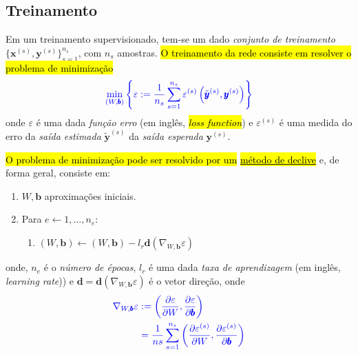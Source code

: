 \subsection{Treinamento}\label{cap_mlp_sec_modelo:ssec:treinamento}

Em um treinamento supervisionado, tem-se um dado \emph{conjunto de treinamento} $\{\pmb{x}^{(s)}, \pmb{y}^{(s)}\}_{s=1}^{n_s}$, com $n_s$ amostras. \hl{O treinamento da rede consiste em resolver o problema de minimização}
\begin{equation}\color{blue}\min_{(W,\pmb{b})}\left\{\varepsilon := \frac{1}{n_s}\sum_{s=1}^{n_s} \varepsilon^{(s)}\left(\tilde{\pmb{y}}^{(s)}, \pmb{y}^{(s)}\right)\right\}
\end{equation}
onde $\varepsilon$ é uma dada \emph{função erro} (em inglês, \hl{\textit{loss function}}) e $\varepsilon^{(s)}$ é uma medida do erro da \emph{saída estimada} $\tilde{\pmb{y}}^{(s)}$ da \emph{saída esperada} $\pmb{y}^{(s)}$.

\hl{O problema de minimização pode ser resolvido por um }\href{https://notaspedrok.com.br/notas/MatematicaNumericaAvancada/cap\_otimizacao_sec_minimi.html}{\hl{método de declive}} e, de forma geral, consiste em:
\begin{enumerate}
\item $W, \pmb{b}$ aproximações iniciais.
\item Para $e\leftarrow 1, \dotsc, n_e$:
  \begin{enumerate}\hleq
  \item $\displaystyle (W, \pmb{b}) \leftarrow (W, \pmb{b}) - l_r\pmb{d}\left(\nabla_{W,\pmb{b}} \varepsilon\right)$
  \end{enumerate}
\end{enumerate}
onde, $n_e$ é o \emph{número de épocas}, $l_r$ é uma dada \emph{taxa de aprendizagem} (em inglês, \textit{learning rate})) e $\pmb{d} = \pmb{d}\left(\nabla_{W,\pmb{b}} \varepsilon\right)$ é o vetor direção, onde
\begin{align}
  \color{blue}\nabla_{W, \pmb{b}} \varepsilon &\color{blue}:= \left(\frac{\partial\varepsilon}{\partial W}, \frac{\partial\varepsilon}{\partial\pmb{b}}\right)\\
  &\color{blue}= \frac{1}{ns}\sum_{s=1}^{n_s}\left(\frac{\partial\varepsilon^{(s)}}{\partial W}, \frac{\partial\varepsilon^{(s)}}{\partial\pmb{b}}\right)
\end{align}


